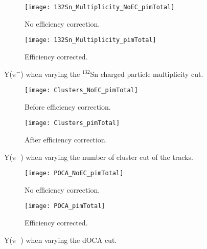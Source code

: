 \begin{figure}[!htb]
     \centering
     \begin{subfigure}[b]{\textwidth}
         \centering
         \texttt{[image: 132Sn\_Multiplicity\_NoEC\_pimTotal]}
         \caption{No efficiency correction.}
         \label{fig:multCutVar}
     \end{subfigure}
     \hfill
    \begin{subfigure}[b]{\textwidth}
         \centering
         \texttt{[image: 132Sn\_Multiplicity\_pimTotal]}
         \caption{Efficiency corrected.}
         \label{fig:multCutVar}
     \end{subfigure}
     \hfill
\caption{Y($\pi^-$) when varying the ${}^{132}$Sn charged particle multiplicity cut. }
\label{fig:cutVar}
\end{figure}



\begin{figure}[!htb]
     \centering
     \begin{subfigure}[b]{\textwidth}
         \centering
         \texttt{[image: Clusters\_NoEC\_pimTotal]}
         \caption{Before efficiency correction.}
         \label{fig:pim_clustVar_NoEC}
     \end{subfigure}
     \hfill
    \begin{subfigure}[b]{\textwidth}
         \centering
         \texttt{[image: Clusters\_pimTotal]}
         \caption{After efficiency correction.}
         \label{fig:pim_clustVar_EC}
     \end{subfigure}
     \hfill
\caption{Y($\pi^-$) when varying the number of cluster cut of the tracks.}
\label{fig:pim_clustVar}
\end{figure}




\begin{figure}[!htb]
     \centering
     \begin{subfigure}[b]{\textwidth}
         \centering
         \texttt{[image: POCA\_NoEC\_pimTotal]}
         \caption{No efficiency correction.}
         \label{fig:pim_cutVarPOCA_NoEC}
     \end{subfigure}
     \hfill
    \begin{subfigure}[b]{\textwidth}
         \centering
         \texttt{[image: POCA\_pimTotal]}
         \caption{Efficiency corrected.}
         \label{fig:pim_cutVarPOCA_EC}
     \end{subfigure}
     \hfill
\caption{Y($\pi^-$) when varying the dOCA cut.}
\label{fig:pim_cutVarPOCA}
\end{figure}





